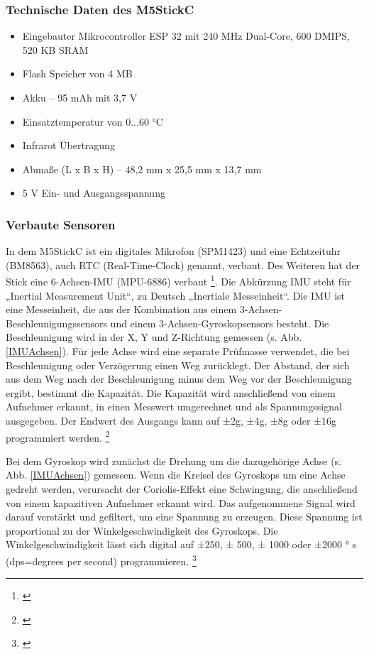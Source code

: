 \subsubsection{Technische Daten des M5StickC}
\begin{itemize}
\item Eingebauter Mikrocontroller ESP 32 mit 240 MHz Dual-Core, 600 DMIPS, 520 KB SRAM
\item Flash Speicher von 4 MB
\item Akku – 95 mAh mit 3,7 V
\item Einsatztemperatur von 0...60 °C
\item Infrarot Übertragung
\item Abmaße (L x B x H) – 48,2 mm x 25,5 mm x 13,7 mm
\item 5 V Ein- und Ausgangsspannung
\end{itemize}

\subsubsection{Verbaute Sensoren}
In dem M5StickC ist ein digitales Mikrofon (SPM1423) und eine Echtzeituhr (BM8563), auch RTC
(Real-Time-Clock) genannt, verbaut. Des Weiteren hat der Stick eine 6-Achsen-IMU (MPU-6886)
verbaut \footnote{\cite{M5STACK.}}. Die Abkürzung IMU steht für „Inertial Measurement Unit“, zu Deutsch
„Inertiale Messeinheit“. Die IMU ist eine Messeinheit, die aus der Kombination aus einem 3-Achsen-Beschleunigungssensors und einem 3-Achsen-Gyroskopsensors besteht. Die Beschleunigung
wird in der X, Y und Z-Richtung gemessen (s. Abb. \ref{IMUAchsen}). Für jede Achse wird eine separate Prüfmasse
verwendet, die bei Beschleunigung oder Verzögerung einen Weg zurücklegt. Der Abstand, der sich aus
dem Weg nach der Beschleunigung minus dem Weg vor der Beschleunigung ergibt, bestimmt die
Kapazität. Die Kapazität wird anschließend von einem Aufnehmer erkannt, in einen Messwert
umgerechnet und als Spannungssignal ausgegeben. Der Endwert des Ausgangs kann auf ±2g, ±4g,
±8g oder ±16g programmiert werden. \footnote{\cite{InvenSense.}}

Bei dem Gyroskop wird zunächst die Drehung um die dazugehörige Achse (s. Abb. \ref{IMUAchsen}) gemessen.
Wenn die Kreisel des Gyroskops um eine Achse gedreht werden, verursacht der Coriolis-Effekt eine
Schwingung, die anschließend von einem kapazitiven Aufnehmer erkannt wird. Das aufgenommene
Signal wird darauf verstärkt und gefiltert, um eine Spannung zu erzeugen. Diese Spannung ist
proportional zu der Winkelgeschwindigkeit des Gyroskops. Die Winkelgeschwindigkeit lässt sich
digital auf ±250, ± 500, ± 1000 oder ±2000 °
s
(dps=degrees per second) programmieren. \footnote{\cite{InvenSense.}}

